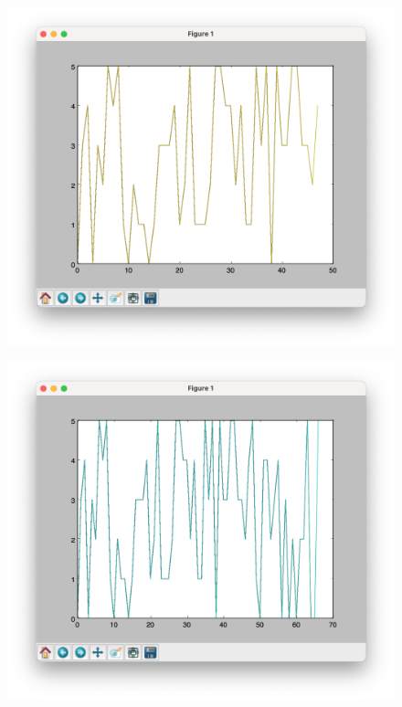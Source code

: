 \documentclass[11pt, a4paper]{article}
\begin{document}
\begin{figure}
    \centering
    \begin{minipage}{.5\textwidth}
      \centering
      \includegraphics[width=\linewidth]{p_fa_3.png}
      \label{fig:test1}
    \end{minipage}%
    \begin{minipage}{.5\textwidth}
      \centering
      \includegraphics[width=\linewidth]{p_fa_4.png}
      \label{fig:test2}
    \end{minipage}
\end{figure}
\end{document}
